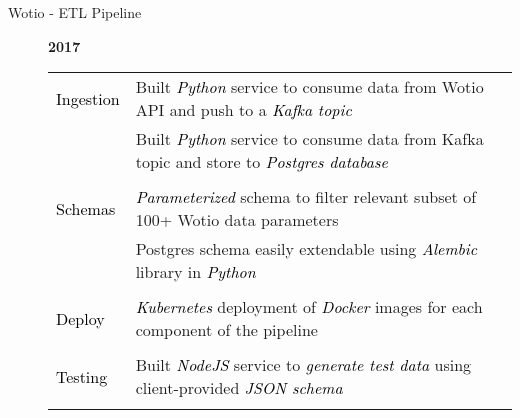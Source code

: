 \documentclass[12pt]{article}
\begin{document}
\begin{description}
\begin{description}
                \item[Wotio - ETL Pipeline] \hfill \textbf{2017}\\
		\textcolor{gray}{
			    \begin{tabular}{l|l}
					\\[-1.0mm]
				\textcolor{black}{Ingestion}& Built \textcolor{black}{\textit{Python}} service to consume data from Wotio API and push to a \textcolor{black}{\textit{Kafka topic}}\\
					  & Built \textcolor{black}{\textit{Python}} service to consume data from Kafka topic and store to \textcolor{black}{\textit{Postgres database}}\\
					\\[-1.7mm]
				\textcolor{black}{Schemas}   & \textcolor{black}{\textit{Parameterized}} schema to filter relevant subset of 100+ Wotio data parameters\\
					  & Postgres schema easily extendable using \textcolor{black}{\textit{Alembic}} library in \textcolor{black}{\textit{Python}}\\
					\\[-1.7mm]
				\textcolor{black}{Deploy}   & \textcolor{black}{\textit{Kubernetes}} deployment of \textcolor{black}{\textit{Docker}} images for each component of the pipeline\\
					\\[-1.7mm]
				\textcolor{black}{Testing}  & Built \textcolor{black}{\textit{NodeJS}} service to \textcolor{black}{\textit{generate test data}} using client-provided \textcolor{black}{\textit{JSON schema}}\\
					\\[-1.0mm]
			    \end{tabular}
		}


\end{description}
\end{description}
\end{document}
